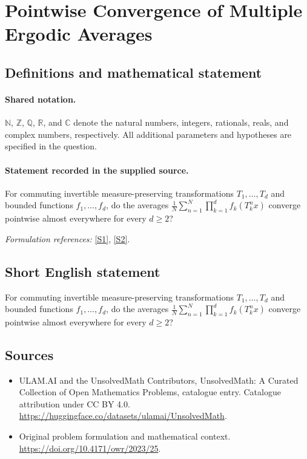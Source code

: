 \documentclass[11pt]{article}
\newcommand{\sref}[2]{\hyperlink{source:#1:#2}{[S#2]}}
\begin{document}
\section{Pointwise Convergence of Multiple Ergodic Averages}\label{statement}

\subsection{Definitions and mathematical statement}

\paragraph{Shared notation.}$\mathbb N$, $\mathbb Z$, $\mathbb Q$, $\mathbb R$, and $\mathbb C$ denote the natural numbers, integers, rationals, reals, and complex numbers, respectively. All additional parameters and hypotheses are specified in the question.


\paragraph{Statement recorded in the supplied source.}
For commuting invertible measure-preserving transformations $T_1,\ldots,T_d$ and bounded functions $f_1,\ldots,f_d$, do the averages $\frac1N\sum_{n=1}^N\prod_{k=1}^d f_k(T_k^n x)$ converge pointwise almost everywhere for every $d\geq2$?
\par\smallskip\textit{Formulation references:} \sref{statement}{1}, \sref{statement}{2}.
\subsection{Short English statement}
For commuting invertible measure-preserving transformations $T_1,\ldots,T_d$ and bounded functions $f_1,\ldots,f_d$, do the averages $\frac1N\sum_{n=1}^N\prod_{k=1}^d f_k(T_k^n x)$ converge pointwise almost everywhere for every $d\geq2$?
\subsection{Sources}
\begin{itemize}
\item[\hypertarget{source:statement:1}{S1}] ULAM.AI and the UnsolvedMath Contributors, UnsolvedMath: A Curated Collection of Open Mathematics Problems, catalogue entry. Catalogue attribution under CC BY 4.0.
\url{https://huggingface.co/datasets/ulamai/UnsolvedMath}.
\item[\hypertarget{source:statement:2}{S2}] Original problem formulation and mathematical context.
\url{https://doi.org/10.4171/owr/2023/25}.
\end{itemize}
\label{end:statement}
\end{document}

